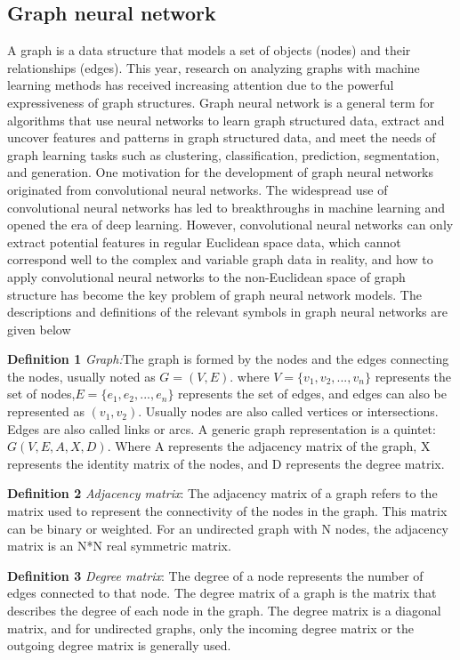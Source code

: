 \documentclass[%
reprint,
amsmath,amssymb,
aps,
]{revtex4-2}
\begin{document}
	\subsection{Graph neural network}
	A graph is a data structure that models a set of objects (nodes) and their relationships (edges). This year, research on analyzing graphs with machine learning methods has received increasing attention due to the powerful expressiveness of graph structures. Graph neural network is a general term for algorithms that use neural networks to learn graph structured data, extract and uncover features and patterns in graph structured data, and meet the needs of graph learning tasks such as clustering, classification, prediction, segmentation, and generation. One motivation for the development of graph neural networks originated from convolutional neural networks. The widespread use of convolutional neural networks has led to breakthroughs in machine learning and opened the era of deep learning. However, convolutional neural networks can only extract potential features in regular Euclidean space data, which cannot correspond well to the complex and variable graph data in reality, and how to apply convolutional neural networks to the non-Euclidean space of graph structure has become the key problem of graph neural network models. The descriptions and definitions of the relevant symbols in graph neural networks are given below
	
	\textbf{Definition 1} \textit{Graph:}The graph is formed by the nodes and the edges connecting the nodes, usually noted as $G=(V,E)$. where $V=\{v_1,v_2,... ,v_n\}$ represents the set of nodes,$E=\{e_1,e_2,... ,e_n\}$ represents the set of edges, and edges can also be represented as $(v_1,v_2)$. Usually nodes are also called vertices or intersections. Edges are also called links or arcs. A generic graph representation is a quintet: $G(V,E,A,X,D)$. Where A represents the adjacency matrix of the graph, X represents the identity matrix of the nodes, and D represents the degree matrix.
	
	\textbf{Definition 2} \textit{Adjacency matrix}: The adjacency matrix of a graph refers to the matrix used to represent the connectivity of the nodes in the graph. This matrix can be binary or weighted. For an undirected graph with N nodes, the adjacency matrix is an N*N real symmetric matrix.
	
	\textbf{Definition 3} \textit{Degree matrix}: The degree of a node represents the number of edges connected to that node. The degree matrix of a graph is the matrix that describes the degree of each node in the graph. The degree matrix is a diagonal matrix, and for undirected graphs, only the incoming degree matrix or the outgoing degree matrix is generally used.
	
\end{document}
